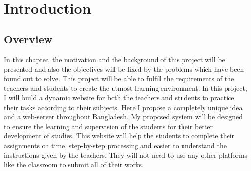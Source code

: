 \chapter{Introduction}



\section{Overview}
In this chapter, the motivation and the background of this project will be presented and also the objectives will be fixed by the problems which have been found out to solve. This project will be able to fulfill the requirements of the teachers and students to create the utmost learning environment. In this project, I will build a dynamic website for both the teachers and students to practice their tasks according to their subjects. Here I propose a completely unique idea and a web-server throughout Bangladesh. My proposed system will be designed to ensure the learning and supervision of the students for their better development of studies. This website will help the students to complete their assignments on time, step-by-step processing and easier to understand the instructions given by the teachers. They will not need to use any other platforms like the classroom to submit all of their works.\\


